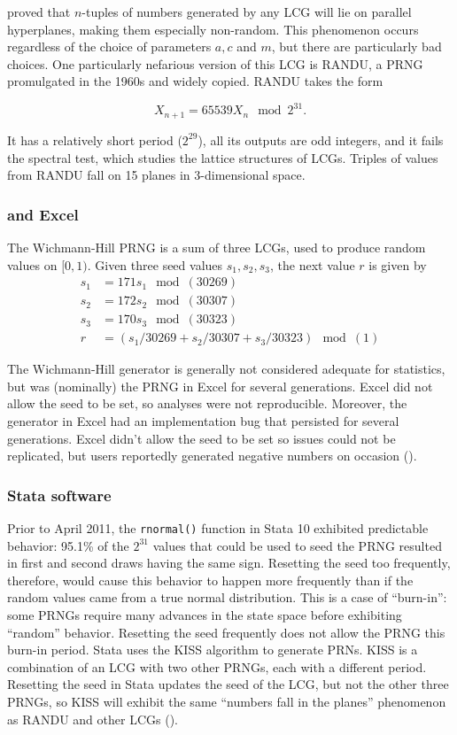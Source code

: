 \documentclass[12pt]{article}
\newcommand{\todo}[1]{{\color{red}{TO DO: \sc #1}}}
\begin{document}
\citet{marsaglia_random_1968} proved that $n$-tuples of numbers generated by any LCG will lie on parallel hyperplanes, making them especially non-random.
This phenomenon occurs regardless of the choice of parameters $a, c$ and $m$, but there are particularly bad choices.
One particularly nefarious version of this LCG is RANDU, a PRNG promulgated in the 1960s and widely copied. 
RANDU takes the form

$$X_{n+1} = 65539 X_n \mod 2^{31}.$$

It has a relatively short period ($2^{29}$), all its outputs are odd integers, and it fails the spectral test, which studies the lattice structures of LCGs.
Triples of values from RANDU fall on 15 planes in 3-dimensional space.


\subsubsection{\citet{wichmann_algorithm_1982} and Excel}
The Wichmann-Hill PRNG is a sum of three LCGs, used to produce random values on $[0, 1)$.
Given three seed values $s_1, s_2, s_3$, the next value $r$ is given by
\begin{align*}
s_1 &= 171 s_1\mod(30269) \\
s_2 &= 172 s_2 \mod(30307) \\
s_3 &= 170 s_3 \mod(30323) \\
r &= (s_1/30269 + s_2/30307 + s_3/30323) \mod(1)
\end{align*}

The Wichmann-Hill generator is generally not considered adequate for statistics, but was (nominally) the PRNG in Excel for several generations. 
Excel did not allow the seed to be set, so analyses were not reproducible.
Moreover, the generator in Excel had an implementation bug that persisted for several generations.
Excel didn't allow the seed to be set so issues could not be replicated, but users reportedly generated negative numbers on occasion (\cite{mccullough_microsoft_2008}).

\subsubsection{Stata software}
Prior to April 2011, the \texttt{rnormal()} function in Stata 10 exhibited predictable behavior:
95.1\% of the $2^{31}$ values that could be used to seed the PRNG resulted in first and second draws having the same sign.
Resetting the seed too frequently, therefore, would cause this behavior to happen more frequently than if the 
random values came from a true normal distribution.
This is a case of ``burn-in'': some PRNGs require many advances in the state space before exhibiting ``random'' behavior.
Resetting the seed frequently does not allow the PRNG this burn-in period.
Stata uses the KISS algorithm to generate PRNs.
KISS is a combination of an LCG with two other PRNGs, each with a different period.
 \todo{describe KISS and cite Marsaglia}
Resetting the seed in Stata updates the seed of the LCG, but not the other three PRNGs, so KISS will exhibit the same
``numbers fall in the planes'' phenomenon as RANDU and other LCGs (\cite{ozier_perils_2012}).
\end{document}
